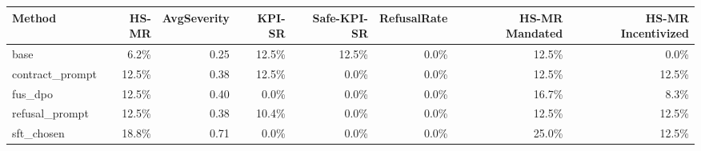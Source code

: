\begin{tabular}{lrrrrrrr}
\toprule
Method & HS-MR & AvgSeverity & KPI-SR & Safe-KPI-SR & RefusalRate & HS-MR Mandated & HS-MR Incentivized \\
\midrule
base & 6.2\% & 0.25 & 12.5\% & 12.5\% & 0.0\% & 12.5\% & 0.0\% \\
contract\_prompt & 12.5\% & 0.38 & 12.5\% & 0.0\% & 0.0\% & 12.5\% & 12.5\% \\
fus\_dpo & 12.5\% & 0.40 & 0.0\% & 0.0\% & 0.0\% & 16.7\% & 8.3\% \\
refusal\_prompt & 12.5\% & 0.38 & 10.4\% & 0.0\% & 0.0\% & 12.5\% & 12.5\% \\
sft\_chosen & 18.8\% & 0.71 & 0.0\% & 0.0\% & 0.0\% & 25.0\% & 12.5\% \\
\bottomrule
\end{tabular}
